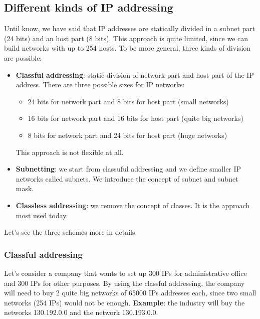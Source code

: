 \subsection{Different kinds of IP addressing}
Until know, we have said that IP addresses are statically divided in a subnet part (24 bits) and an host part (8 bits). This approach is quite limited, since we can build networks with up to 254 hosts. To be more general, three kinds of division are possible:
\begin{itemize}
    \item \textbf{Classful addressing}: static division of network part and host part of the IP address. There are three possible sizes for IP networks:
    \begin{itemize}
        \item 24 bits for network part and 8 bits for host part (small networks)
        \item 16 bits for network part and 16 bits for host part (quite big networks)
        \item 8 bits for network part and 24 bits for host part (huge networks)
    \end{itemize}
    This approach is not flexible at all.
    \item \textbf{Subnetting}: we start from classuful addressing and we define smaller IP networks called subnets. We introduce the concept of subnet and subnet mask.
    \item \textbf{Classless addressing}: we remove the concept of classes. It is the approach most used today.
\end{itemize}

\noindent Let's see the three schemes more in details.
\subsubsection{Classful addressing}
Let's consider a company that wants to set up 300 IPs for administrative office and 300 IPs for other purposes. By using the classful addressing, the company will need to buy 2 quite big networks of 65000 IPs addresses each, since two small networks (254 IPs) would not be enough. \textbf{Example}: the industry will buy the networks 130.192.0.0 and the network 130.193.0.0.

